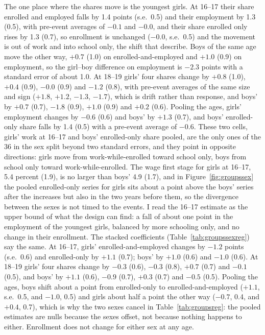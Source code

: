 \documentclass[12pt]{article}
\begin{document}
The one place where the shares move is the youngest girls. At 16--17 their share enrolled and employed falls by 1.4 points (s.e.\ 0.5) and their employment by 1.3 (0.5), with pre-event averages of $-0.1$ and $-0.0$, and their share enrolled only rises by 1.3 (0.7), so enrollment is unchanged ($-0.0$, s.e.\ 0.5) and the movement is out of work and into school only, the shift that \citet{neumark2019} describe. Boys of the same age move the other way, $+0.7$ (1.0) on enrolled-and-employed and $+1.0$ (0.9) on employment, so the girl--boy difference on employment is $-2.3$ points with a standard error of about 1.0. At 18--19 girls' four shares change by $+0.8$ (1.0), $+0.4$ (0.9), $-0.0$ (0.9) and $-1.2$ (0.8), with pre-event averages of the same size and sign ($+1.8$, $+1.2$, $-1.3$, $-1.7$), which is drift rather than response, and boys' by $+0.7$ (0.7), $-1.8$ (0.9), $+1.0$ (0.9) and $+0.2$ (0.6). Pooling the ages, girls' employment changes by $-0.6$ (0.6) and boys' by $+1.3$ (0.7), and boys' enrolled-only share falls by 1.4 (0.5) with a pre-event average of $-0.6$. These two cells, girls' work at 16--17 and boys' enrolled-only share pooled, are the only ones of the 36 in the sex split beyond two standard errors, and they point in opposite directions: girls move from work-while-enrolled toward school only, boys from school only toward work-while-enrolled. The wage first stage for girls at 16--17, 5.4 percent (1.9), is no larger than boys' 4.9 (1.7), and in Figure~\ref{fig:groupssex} the pooled enrolled-only series for girls sits about a point above the boys' series after the increases but also in the two years before them, so the divergence between the sexes is not timed to the events. I read the 16--17 estimate as the upper bound of what the design can find: a fall of about one point in the employment of the youngest girls, balanced by more schooling only, and no change in their enrollment. The stacked coefficients (Table~\ref{tab:groupssexreg}) say the same. At 16--17, girls' enrolled-and-employed changes by $-1.2$ points (s.e.\ 0.6) and enrolled-only by $+1.1$ (0.7); boys' by $+1.0$ (0.6) and $-1.0$ (0.6). At 18--19 girls' four shares change by $-0.3$ (0.6), $-0.3$ (0.8), $+0.7$ (0.7) and $-0.1$ (0.5), and boys' by $+1.1$ (0.6), $-0.9$ (0.7), $+0.3$ (0.7) and $-0.5$ (0.5). Pooling the ages, boys shift about a point from enrolled-only to enrolled-and-employed ($+1.1$, s.e.\ 0.5, and $-1.0$, 0.5) and girls about half a point the other way ($-0.7$, 0.4, and $+0.4$, 0.7), which is why the two sexes cancel in Table~\ref{tab:groupsreg}: the pooled estimates are nulls because the sexes offset, not because nothing happens to either. Enrollment does not change for either sex at any age.
\end{document}
